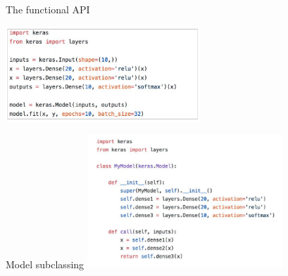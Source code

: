 \documentclass[aspectratio=169,14pt,usenames,dvipsnames]{beamer}
\begin{document}
\begin{frame}{The functional API}
\centering

\includegraphics[width=0.55\textwidth, height=0.45\textheight]{Keras_Images/Ker_2.png}
\end{frame}

\begin{frame}{Model subclassing}
\centering
\includegraphics[width=0.55\textwidth, height=0.6\textheight]{Keras_Images/Ker_3.png}
\end{frame}
\end{document}
